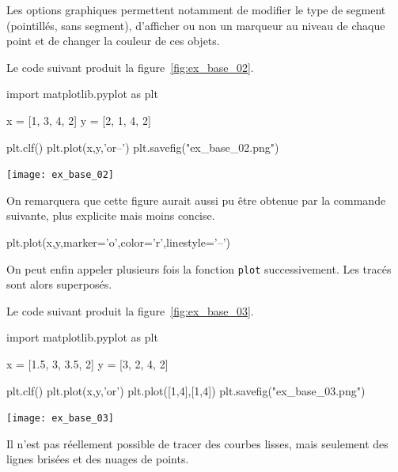 Les options graphiques permettent notamment de modifier le type de segment (pointillés, sans segment), d'afficher ou non un marqueur au niveau de chaque point et de changer la couleur de ces objets. 
\begin{exemple}
  Le code suivant produit la figure~\ref{fig:ex_base_02}.
\begin{pyverbatim}
import matplotlib.pyplot as plt

x = [1, 3, 4, 2]
y = [2, 1, 4, 2]

plt.clf()
plt.plot(x,y,'or--')
plt.savefig("ex_base_02.png")
\end{pyverbatim}
  \begin{center}
    \texttt{[image: ex\_base\_02]}
    \label{fig:ex_base_02}
  \end{center}
On remarquera que cette figure aurait aussi pu être obtenue par la commande suivante, plus explicite mais moins concise. 
\begin{pyverbatim}
plt.plot(x,y,marker='o',color='r',linestyle='--')
\end{pyverbatim}
\end{exemple}

On peut enfin appeler plusieurs fois la fonction \texttt{plot} successivement. Les tracés sont alors superposés. 
\begin{exemple}
  Le code suivant produit la figure~\ref{fig:ex_base_03}.
\begin{pyverbatim}
import matplotlib.pyplot as plt

x = [1.5, 3, 3.5, 2]
y = [3, 2, 4, 2]

plt.clf()
plt.plot(x,y,'or')
plt.plot([1,4],[1,4])
plt.savefig("ex_base_03.png")
\end{pyverbatim}
  \begin{center}
    \texttt{[image: ex\_base\_03]}
    \label{fig:ex_base_03}
  \end{center}
\end{exemple}
\begin{rem}
  Il n'est pas réellement possible de tracer des courbes lisses, mais seulement des lignes brisées et des nuages de 
points. 
\end{rem}


